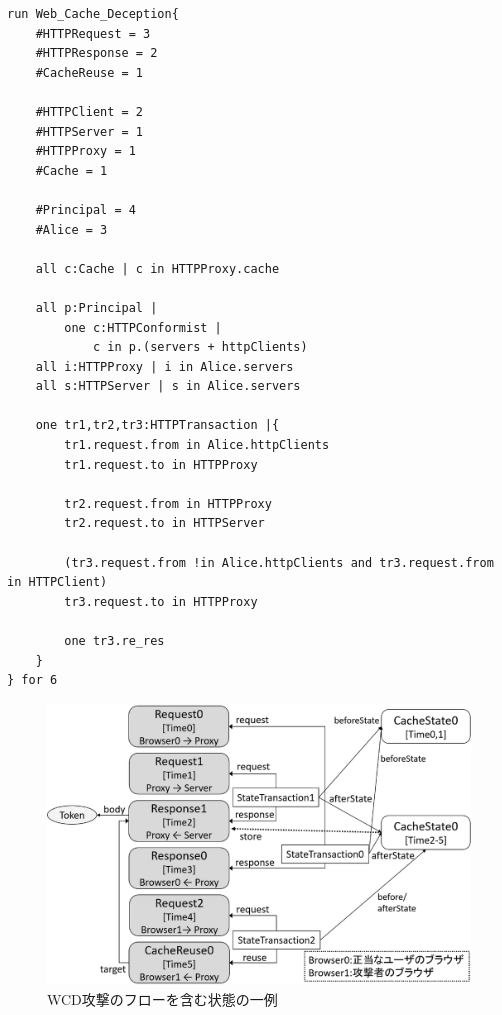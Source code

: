 \documentclass[12pt,a4paper]{jbook}
\begin{document}
\begin{lstlisting}[caption=WCD攻撃の表現, label=code:WCD]
run Web_Cache_Deception{
	#HTTPRequest = 3
	#HTTPResponse = 2
	#CacheReuse = 1

	#HTTPClient = 2
	#HTTPServer = 1
	#HTTPProxy = 1
	#Cache = 1

	#Principal = 4
	#Alice = 3

	all c:Cache | c in HTTPProxy.cache

	all p:Principal |
		one c:HTTPConformist |
			c in p.(servers + httpClients)
	all i:HTTPProxy | i in Alice.servers
	all s:HTTPServer | s in Alice.servers

	one tr1,tr2,tr3:HTTPTransaction |{
		tr1.request.from in Alice.httpClients
		tr1.request.to in HTTPProxy

		tr2.request.from in HTTPProxy
		tr2.request.to in HTTPServer

		(tr3.request.from !in Alice.httpClients and tr3.request.from in HTTPClient)
		tr3.request.to in HTTPProxy

		one tr3.re_res
	}
} for 6
\end{lstlisting}

\begin{figure}[htb]
\centering
\includegraphics[width=450pt]{./fig/WCD_alloy.eps}
\caption{WCD攻撃のフローを含む状態の一例}
\label{fig:WCD_alloy}
\end{figure}

\color{black}
\end{document}

